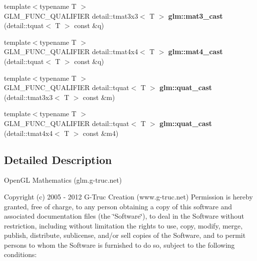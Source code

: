 \begin{DoxyCompactItemize}
\item 
\hypertarget{namespaceglm_a7a946402c77631a860e51923f2918d90}{{\footnotesize template$<$typename T $>$ }\\\-G\-L\-M\-\_\-\-F\-U\-N\-C\-\_\-\-Q\-U\-A\-L\-I\-F\-I\-E\-R \*
detail\-::tmat3x3$<$ \-T $>$ {\bfseries glm\-::mat3\-\_\-cast} (detail\-::tquat$<$ \-T $>$ const \&q)}\label{namespaceglm_a7a946402c77631a860e51923f2918d90}

\item 
\hypertarget{namespaceglm_ae3646fbdaa9b39f7cdc0d35fa7f3550d}{{\footnotesize template$<$typename T $>$ }\\\-G\-L\-M\-\_\-\-F\-U\-N\-C\-\_\-\-Q\-U\-A\-L\-I\-F\-I\-E\-R \*
detail\-::tmat4x4$<$ \-T $>$ {\bfseries glm\-::mat4\-\_\-cast} (detail\-::tquat$<$ \-T $>$ const \&q)}\label{namespaceglm_ae3646fbdaa9b39f7cdc0d35fa7f3550d}

\item 
\hypertarget{namespaceglm_aaedb2e6d97b7cc7d417c416d4b48740e}{{\footnotesize template$<$typename T $>$ }\\\-G\-L\-M\-\_\-\-F\-U\-N\-C\-\_\-\-Q\-U\-A\-L\-I\-F\-I\-E\-R \*
detail\-::tquat$<$ \-T $>$ {\bfseries glm\-::quat\-\_\-cast} (detail\-::tmat3x3$<$ \-T $>$ const \&m)}\label{namespaceglm_aaedb2e6d97b7cc7d417c416d4b48740e}

\item 
\hypertarget{namespaceglm_af35903d36817ff7b1a42ceec0107eb16}{{\footnotesize template$<$typename T $>$ }\\\-G\-L\-M\-\_\-\-F\-U\-N\-C\-\_\-\-Q\-U\-A\-L\-I\-F\-I\-E\-R \*
detail\-::tquat$<$ \-T $>$ {\bfseries glm\-::quat\-\_\-cast} (detail\-::tmat4x4$<$ \-T $>$ const \&m4)}\label{namespaceglm_af35903d36817ff7b1a42ceec0107eb16}

\end{DoxyCompactItemize}


\subsection{\-Detailed \-Description}
\-Open\-G\-L \-Mathematics (glm.\-g-\/truc.\-net)

\-Copyright (c) 2005 -\/ 2012 \-G-\/\-Truc \-Creation (www.\-g-\/truc.\-net) \-Permission is hereby granted, free of charge, to any person obtaining a copy of this software and associated documentation files (the \char`\"{}\-Software\char`\"{}), to deal in the \-Software without restriction, including without limitation the rights to use, copy, modify, merge, publish, distribute, sublicense, and/or sell copies of the \-Software, and to permit persons to whom the \-Software is furnished to do so, subject to the following conditions\-:

